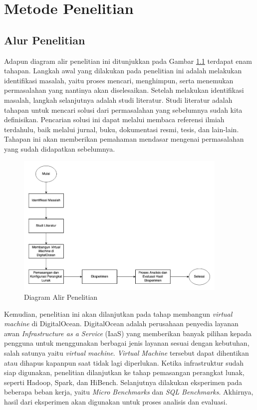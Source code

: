\chapter{Metode Penelitian}
\section{Alur Penelitian}
Adapun diagram alir penelitian ini ditunjukkan pada Gambar \ref{fig:diagram alir} terdapat enam tahapan. Langkah awal yang dilakukan pada penelitian ini adalah melakukan identifikasi masalah, yaitu proses mencari, menghimpun, serta menemukan permasalahan yang nantinya akan diselesaikan. Setelah melakukan identifikasi masalah, langkah selanjutnya adalah studi literatur. Studi literatur adalah tahapan untuk mencari solusi dari permasalahan yang sebelumnya sudah kita definisikan. Pencarian solusi ini dapat melalui membaca referensi ilmiah terdahulu, baik melalui jurnal, buku, dokumentasi resmi, tesis, dan lain-lain. Tahapan ini akan memberikan pemahaman mendasar mengenai permasalahan yang sudah didapatkan sebelumnya. 

\begin{figure}[h!]
    \centering
    \includegraphics[width=0.9\textwidth]{figures/ch03/Diagram Tugas Akhir.png}
    \caption{Diagram Alir Penelitian}
    \label{fig:diagram alir}
\end{figure}

Kemudian, penelitian ini akan dilanjutkan pada tahap membangun \textit{virtual machine} di DigitalOcean. DigitalOcean adalah perusahaan penyedia layanan awan \textit{Infrastructure as a Service} (IaaS) yang memberikan banyak pilihan kepada pengguna untuk menggunakan berbagai jenis layanan sesuai dengan kebutuhan, salah satunya yaitu \textit{virtual machine}. \textit{Virtual Machine} tersebut dapat dihentikan atau dihapus kapanpun saat tidak lagi diperlukan. Ketika infrastruktur sudah siap digunakan, penelitian dilanjutkan ke tahap pemasangan perangkat lunak, seperti Hadoop, Spark, dan HiBench. Selanjutnya dilakukan eksperimen pada beberapa beban kerja, yaitu \textit{Micro Benchmarks} dan \textit{SQL Benchmarks}. Akhirnya, hasil dari eksperimen akan digunakan untuk proses analisis dan evaluasi.

